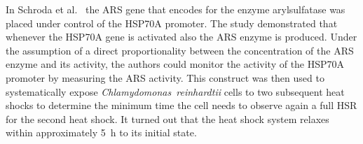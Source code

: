 \documentclass[oneside, 10pt, a4paper, twocolumn]{article}
\begin{document}


In Schroda et al.~\cite{Schroda2000} the ARS gene that encodes for the enzyme arylsulfatase 
was placed under control
of the HSP70A promoter. The study demonstrated that whenever the HSP70A gene is activated also the ARS enzyme is produced.
Under the assumption of a direct proportionality between the concentration of the ARS enzyme and its activity, 
the authors could monitor the activity of the HSP70A promoter by measuring the ARS activity.
This construct was then used to systematically expose \textit{Chlamydomonas~reinhardtii} cells to two
subsequent heat shocks to determine the minimum time
the cell needs to observe again a full HSR for the second heat shock.
It turned out that the heat shock system relaxes within approximately  5~h to its initial state.
\end{document}
